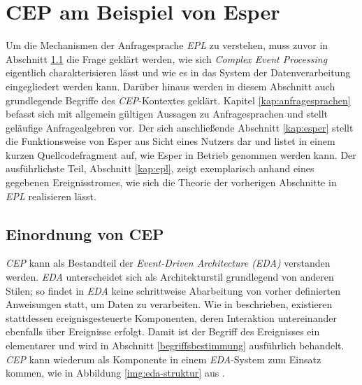 \documentclass{acm_proc_article-sp}
\begin{document}
%
%

\section{CEP am Beispiel von Esper}
\vspace{0.1cm}

Um die Mechanismen der Anfragesprache \textit{EPL} zu verstehen, muss zuvor in Abschnitt 
\ref{kap:einordnung} die Frage 
geklärt werden, wie sich \textit{Complex Event Processing} eigentlich charakterisieren 
lässt und wie es in das System der Datenverarbeitung eingegliedert werden kann. Darüber 
hinaus werden in diesem Abschnitt auch grundlegende Begriffe des \textit{CEP}-Kontextes 
geklärt. Kapitel \ref{kap:anfragesprachen} befasst sich mit allgemein gültigen Aussagen 
zu Anfragesprachen und stellt geläufige Anfragealgebren vor. Der sich anschließende 
Abschnitt \ref{kap:esper} stellt die Funktionsweise von Esper aus Sicht eines Nutzers dar 
und listet in einem kurzen Quellcodefragment auf, wie Esper in Betrieb genommen werden 
kann. Der ausführlichste Teil, Abschnitt \ref{kap:epl}, zeigt exemplarisch anhand eines 
gegebenen Ereignisstromes, wie sich die Theorie der vorherigen Abschnitte in 
\textit{EPL} realisieren lässt.

\newpage
\subsection{Einordnung von CEP}\label{kap:einordnung}
\vspace{0.1cm}
\textit{CEP} kann als Bestandteil der \textit{Event-Driven Architecture (EDA)} verstanden 
werden. \textit{EDA} unterscheidet sich als Architekturstil 
grundlegend von anderen Stilen; so findet in \textit{EDA} keine schrittweise Abarbeitung 
von vorher definierten Anweisungen statt, um Daten zu verarbeiten. Wie in \cite{glossary} 
beschrieben, existieren stattdessen ereignisgesteuerte Komponenten, deren Interaktion 
untereinander ebenfalls über Ereignisse erfolgt. Damit ist der Begriff des Ereignisses 
ein elementarer und wird in Abschnitt \ref{begriffsbestimmung} ausführlich behandelt. 
\textit{CEP} kann wiederum als Komponente in einem \textit{EDA}-System zum Einsatz 
kommen, wie in Abbildung \ref{img:eda-struktur} aus \cite{bruns}.
\end{document}
